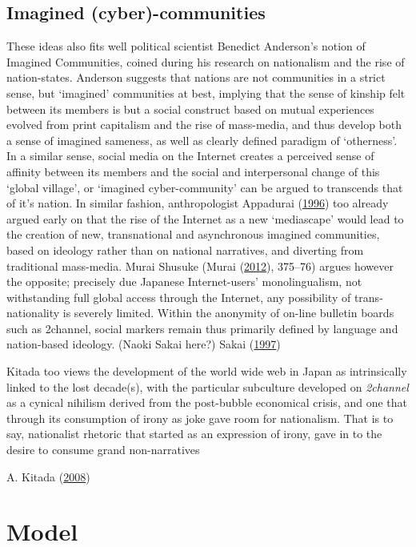 \documentclass[10pt,british,A4paper,,openany]{memoir}
\begin{document}
\subsection{Imagined
(cyber)-communities}\label{imagined-cyber-communities}

These ideas also fits well political scientist Benedict Anderson's
notion of Imagined Communities, coined during his research on
nationalism and the rise of nation-states. Anderson suggests that
nations are not communities in a strict sense, but `imagined'
communities at best, implying that the sense of kinship felt between its
members is but a social construct based on mutual experiences evolved
from print capitalism and the rise of mass-media, and thus develop both
a sense of imagined sameness, as well as clearly defined paradigm of
`otherness'. In a similar sense, social media on the Internet creates a
perceived sense of affinity between its members and the social and
interpersonal change of this `global village', or `imagined
cyber-community' can be argued to transcends that of it's nation. In
similar fashion, anthropologist Appadurai
(\protect\hyperlink{ref-appadurai_modernity_1996}{1996}) too already
argued early on that the rise of the Internet as a new `mediascape'
would lead to the creation of new, transnational and asynchronous
imagined communities, based on ideology rather than on national
narratives, and diverting from traditional mass-media. Murai Shusuke
(Murai (\protect\hyperlink{ref-murai_net_2012}{2012}), 375--76) argues
however the opposite; precisely due Japanese Internet-users'
monolingualism, not withstanding full global access through the
Internet, any possibility of trans-nationality is severely limited.
Within the anonymity of on-line bulletin boards such as 2channel, social
markers remain thus primarily defined by language and nation-based
ideology. (Naoki Sakai here?) Sakai
(\protect\hyperlink{ref-sakai_translation_1997}{1997})

Kitada too views the development of the world wide web in Japan as
intrinsically linked to the lost decade(s), with the particular
subculture developed on \emph{2channel} as a cynical nihilism derived
from the post-bubble economical crisis, and one that through its
consumption of irony as joke gave room for nationalism. That is to say,
nationalist rhetoric that started as an expression of irony, gave in to
the desire to consume grand non-narratives

A. Kitada (\protect\hyperlink{ref-kitada__2008}{2008})

\section{Model}\label{model}
\end{document}
